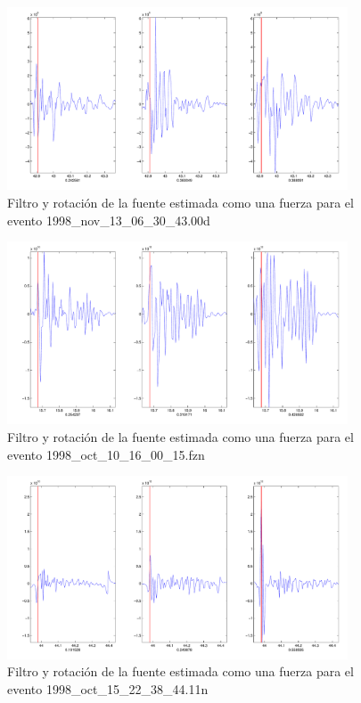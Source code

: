 \begin{figure}[H]
\includegraphics[width=0.9\textwidth,height=0.4\textheight]{linea_timerev/figuras/plotSrcEv16filtrotsrc.pdf}
\caption{Filtro y rotación de la fuente estimada como una fuerza para el
evento 1998\_nov\_13\_06\_30\_43.00d}
\end{figure}
\begin{figure}[H]
\includegraphics[width=0.9\textwidth,height=0.4\textheight]{linea_timerev/figuras/plotSrcEv17filtrotsrc.pdf}
\caption{Filtro y rotación de la fuente estimada como una fuerza para el
evento 1998\_oct\_10\_16\_00\_15.fzn}
\end{figure}
\begin{figure}[H]
\includegraphics[width=0.9\textwidth,height=0.4\textheight]{linea_timerev/figuras/plotSrcEv18filtrotsrc.pdf}
\caption{Filtro y rotación de la fuente estimada como una fuerza para el
evento 1998\_oct\_15\_22\_38\_44.11n}
\end{figure}
